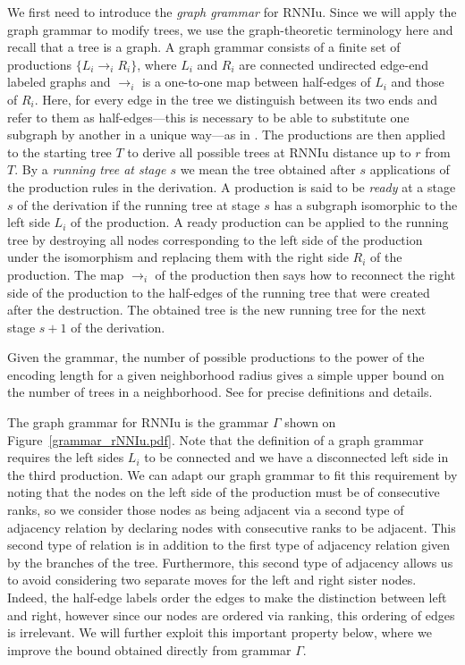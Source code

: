 \documentclass[11pt]{amsart}
\theoremstyle{definition}
\newcommand{\rnniu}{\mathrm{RNNIu}}
\begin{document}
We first need to introduce the \emph{graph grammar} for $\rnniu$.
Since we will apply the graph grammar to modify trees, we use the graph-theoretic terminology here and recall that a tree is a graph.
A graph grammar consists of a finite set of productions $\{L_i \to_i R_i\}$, where $L_i$ and $R_i$ are connected undirected edge-end labeled graphs and $\to_i$ is a one-to-one map between half-edges of $L_i$ and those of $R_i$.
Here, for every edge in the tree we distinguish between its two ends and refer to them as half-edges---this is necessary to be able to substitute one subgraph by another in a unique way---as in \autocite{Sleator1992-bp}.
The productions are then applied to the starting tree $T$ to derive all possible trees at $\rnniu$ distance up to $r$ from $T$.
By a \emph{running tree at stage $s$} we mean the tree obtained after $s$ applications of the production rules in the derivation.
A production is said to be \emph{ready} at a stage $s$ of the derivation if the running tree at stage $s$ has a subgraph isomorphic to the left side $L_i$ of the production.
A ready production can be applied to the running tree by destroying all nodes corresponding to the left side of the production under the isomorphism and replacing them with the right side $R_i$ of the production.
The map $\to_i$ of the production then says how to reconnect the right side of the production to the half-edges of the running tree that were created after the destruction.
The obtained tree is the new running tree for the next stage $s+1$ of the derivation.

Given the grammar, the number of possible productions to the power of the encoding length for a given neighborhood radius gives a simple upper bound on the number of trees in a neighborhood.
See \autocite{Sleator1992-bp} for precise definitions and details.

The graph grammar for $\rnniu$ is the grammar $\Gamma$ shown on Figure~\ref{grammar_rNNIu.pdf}.
Note that the definition of a graph grammar requires the left sides $L_i$ to be connected and we have a disconnected left side in the third production.
We can adapt our graph grammar to fit this requirement by noting that the nodes on the left side of the production must be of consecutive ranks, so we consider those nodes as being adjacent via a second type of adjacency relation by declaring nodes with consecutive ranks to be adjacent.
This second type of relation is in addition to the first type of adjacency relation given by the branches of the tree.
Furthermore, this second type of adjacency allows us to avoid considering two separate moves for the left and right sister nodes.
Indeed, the half-edge labels order the edges to make the distinction between left and right, however since our nodes are ordered via ranking, this ordering of edges is irrelevant.
We will further exploit this important property below, where we improve the bound obtained directly from grammar $\Gamma$.
\end{document}
